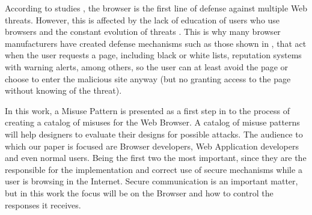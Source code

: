 \documentclass{sig-alternate-05-2015}
\begin{document}
According to studies \cite{browSecPhish,Labs2013,rowSecSEMBlock}, the browser is the first line of defense against multiple Web threats. However, this is affected by the lack of education of users who use browsers and the constant evolution of threats \cite{browSecPhish}. This is why many browser manufacturers have created defense mechanisms such as those shown in \cite{Drake2011}, that act when the user requests a page, including black or white lists, reputation systems \cite{Rajab2013} with warning alerts, among others, so the user can at least avoid the page or choose to enter the malicious site anyway (but no granting access to the page without knowing of the threat).

In this work, a Misuse Pattern is presented as a first step in to the process of creating a catalog of misuses for the Web Browser. A catalog of misuse patterns will help designers to evaluate their designs for possible attacks. The audience to which our paper is focused are Browser developers, Web Application developers and even normal users. Being the first two the most important, since they are the responsible for the implementation and correct use of secure mechanisms while a user is browsing in the Internet. Secure communication is an important matter, but in this work the focus will be on the Browser and how to control the responses it receives.
\end{document}
